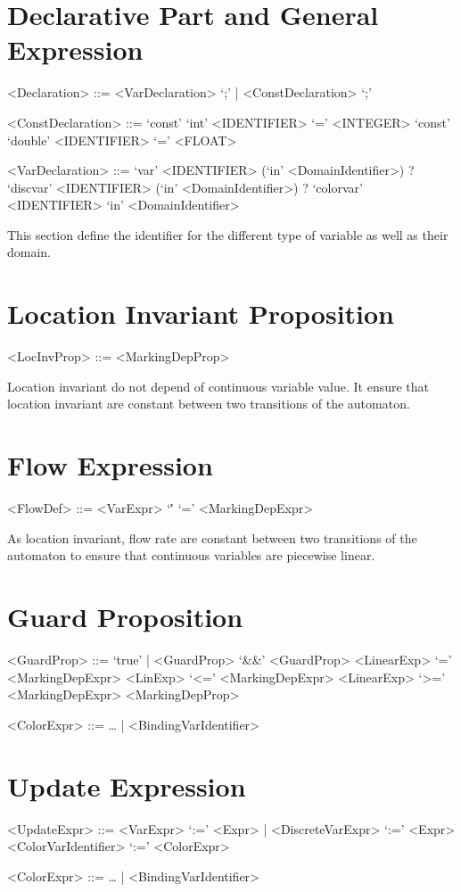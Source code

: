 \documentclass{article}
\begin{document}
\section{Declarative Part and General Expression}

\begin{grammar}
  <Declaration> ::= <VarDeclaration> `;' | <ConstDeclaration> `;'

  <ConstDeclaration> ::= 
  `const' `int' <IDENTIFIER> `=' <INTEGER>
  \alt `const' `double' <IDENTIFIER> `=' <FLOAT>

  <VarDeclaration> ::= 
   `var' <IDENTIFIER> (`in' <DomainIdentifier>) ?
   \alt `discvar' <IDENTIFIER> (`in' <DomainIdentifier>) ?
   \alt `colorvar' <IDENTIFIER> `in' <DomainIdentifier>
\end{grammar}

This section define the identifier for the different type of variable
as well as their domain.

\section{Location Invariant Proposition}

\begin{grammar}
  <LocInvProp> ::= <MarkingDepProp>
\end{grammar}

Location invariant do not depend of continuous variable value.
It ensure that location invariant are constant between two transitions
of the automaton.

\section{Flow Expression}

\begin{grammar}
  <FlowDef> ::= <VarExpr> `\'' `=' <MarkingDepExpr> 
\end{grammar}
As location invariant, flow rate are constant between two transitions
of the automaton to ensure that continuous variables are piecewise
linear.


\section{Guard Proposition}
\begin{grammar}
  <GuardProp> ::= `true' | <GuardProp> `\&\&' <GuardProp>
  \alt <LinearExp> `=' <MarkingDepExpr> \alt <LinExp> `<=' <MarkingDepExpr>
  \alt <LinearExp> `>=' <MarkingDepExpr>
  \alt <MarkingDepProp>

  <ColorExpr> ::= \dots\! | <BindingVarIdentifier>
\end{grammar}


\section{Update Expression}

\begin{grammar}
  <UpdateExpr> ::= <VarExpr> `:=' <Expr> | <DiscreteVarExpr> `:=' <Expr>
  \alt <ColorVarIdentifier> `:=' <ColorExpr>

   <ColorExpr> ::= \dots\! | <BindingVarIdentifier>
\end{grammar}
\end{document}
